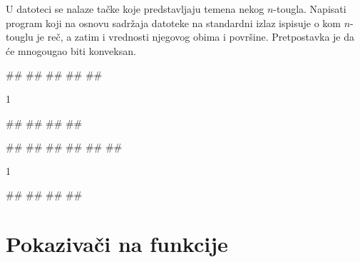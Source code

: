 \begin{Exercise}[difficulty=2, label=2_26]
U datoteci  se nalaze tačke koje predstavljaju
temena nekog $n$-tougla. Napisati program koji na osnovu
sadržaja datoteke na standardni izlaz ispisuje o kom
$n$-touglu je reč, a zatim i vrednosti njegovog obima i
površine. Pretpostavka je da će mnogougao biti konveksan.

\begin{miditest}
\begin{upotreba}{1}
##
##
##
##
##
\end{upotreba}
\end{miditest}
\begin{miditest}
\begin{test2}{1}



#\naslovInt#
##
##
##
\end{test2}
\end{miditest}

\begin{miditest}
\begin{upotreba}{2}
##
##
##
##
##
##
\end{upotreba}
\end{miditest}
\begin{miditest}
\begin{test2}{1}



#\naslovInt#
##
##
##
\end{test2}
\end{miditest}
\end{Exercise}

\section{Pokazivači na funkcije}


